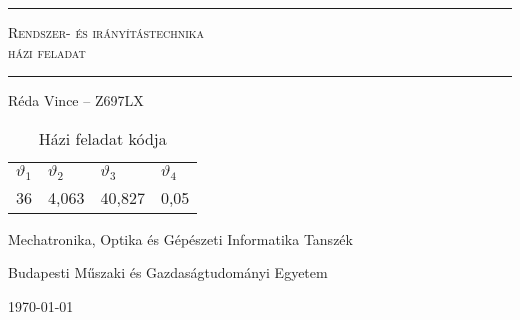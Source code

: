 \begin{titlepage}
\begin{center}

\vspace*{1cm}

{\hrule height 1pt}
\vspace{3mm}
\Huge
\textsc{Rendszer- és irányítástechnika}\\
\Large
\textsc{házi feladat}
\vspace{6mm}
{\hrule height 1pt}
\vspace{14mm}

\Large
Réda Vince -- Z697LX
\normalsize
\vspace{2cm}

\vfill
\begin{table}[H]
\begin{tabular}{llll}
\toprule
$\vartheta_1$& $\vartheta_2$& $\vartheta_3$& $\vartheta_4$\\
36& 4,063& 40,827& 0,05\\
\bottomrule
\end{tabular}
\caption{Házi feladat kódja}
\end{table}
\vspace{1cm}

\large
Mechatronika, Optika és Gépészeti Informatika Tanszék

Budapesti Műszaki és Gazdaságtudományi Egyetem

\vspace{5mm}
\today

\end{center}
\end{titlepage}
